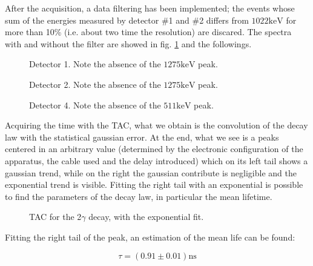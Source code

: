 \documentclass[11pt,a4 paper]{article}
\begin{document}
After the acquisition, a data filtering has been implemented; the events whose sum of the energies measured by detector \#1 and \#2 differs from $1022\si{\kilo\electronvolt}$ for more than 10\% (i.e. about two time the resolution) are discared. The spectra with and without the filter are showed in fig. \ref{fig:det1:2gamma} and the followings.

\begin{figure}[H]
    \centering
    \caption{Detector 1. Note the absence of the $1275\si{\kilo\electronvolt}$ peak.}
    \label{fig:det1:2gamma}
\end{figure}

\begin{figure}[H]
    \centering
    \caption{Detector 2. Note the absence of the $1275\si{\kilo\electronvolt}$ peak.}
    \label{fig:det2:2gamma}
\end{figure}

\begin{figure}[H]
    \centering
    \caption{Detector 4. Note the absence of the $511\si{\kilo\electronvolt}$ peak.}
    \label{fig:det4:2gamma}
\end{figure}

Acquiring the time with the TAC, what we obtain is the convolution of the decay law with the statistical gaussian error. At the end, what we see is a peaks centered in an arbitrary value (determined by the electronic configuration of the apparatus, the cable used and the delay introduced) which on its left tail shows a gaussian trend, while on the right the gaussian contribute is negligible and the exponential trend is visible. Fitting the right tail with an exponential is possible to find the parameters of the decay law, in particular the mean lifetime.

\begin{figure}[H]
    \centering
    \caption{TAC for the 2$\gamma$ decay, with the exponential fit.}
    \label{fig:tac:2gamma}
\end{figure}

Fitting the right tail of the peak, an estimation of the mean life can be found:

\begin{equation*}
    \tau = ( 0.91 \pm 0.01) \si{\nano\second}
\end{equation*}
\end{document}
